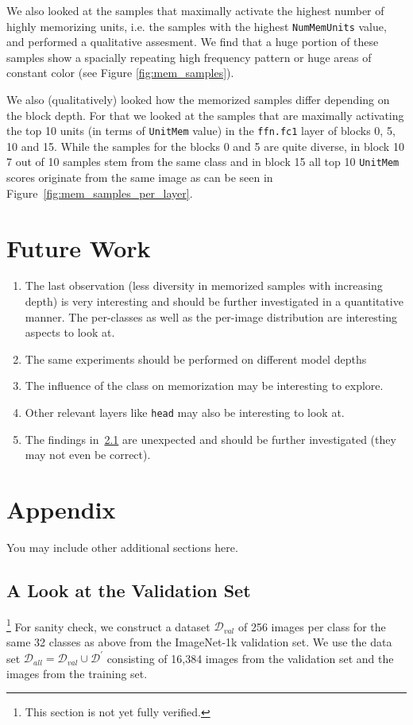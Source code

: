 \documentclass{article} %
\begin{document}
We also looked at the samples that maximally activate the highest number of highly memorizing units, i.e. the samples with the highest \texttt{NumMemUnits} value, and performed a qualitative assesment.
We find that a huge portion of these samples show a spacially repeating high frequency pattern or huge areas of constant color (see Figure \ref{fig:mem_samples}).

We also (qualitatively) looked how the memorized samples differ depending on the block depth.
For that we looked at the samples that are maximally activating the top 10 units (in terms of \texttt{UnitMem} value) in the \texttt{ffn.fc1} layer of blocks 0, 5, 10 and 15.
While the samples for the blocks 0 and 5 are quite diverse, in block 10 7 out of 10 samples stem from the same class and in block 15 all top 10 \texttt{UnitMem} scores originate from the same image as can be seen in Figure~\ref{fig:mem_samples_per_layer}.

\section{Future Work}
\begin{enumerate}
   \item The last observation (less diversity in memorized samples with increasing depth) is very interesting and should be further investigated in a quantitative manner.
   The per-classes as well as the per-image distribution are interesting aspects to look at.
   \item The same experiments should be performed on different model depths
   \item The influence of the class on memorization may be interesting to explore.
   \item Other relevant layers like \texttt{head} may also be interesting to look at.
   \item The findings in~\ref{look_at_val} are unexpected and should be further investigated (they may not even be correct).
\end{enumerate}






\newpage
\appendix
\section{Appendix}
You may include other additional sections here.
\subsection{A Look at the Validation Set}\label{look_at_val}\footnote{This section is not yet fully verified.}
For sanity check, we construct a dataset $\mathcal{D}_{val}$ of 256 images per class for the same 32 classes as above from the ImageNet-1k validation set.
We use the data set $\mathcal{D}_{all} = \mathcal{D}_{val} \cup \mathcal{D}^\prime$ consisting of 16,384 images from the validation set and the images from the training set.
\end{document}
